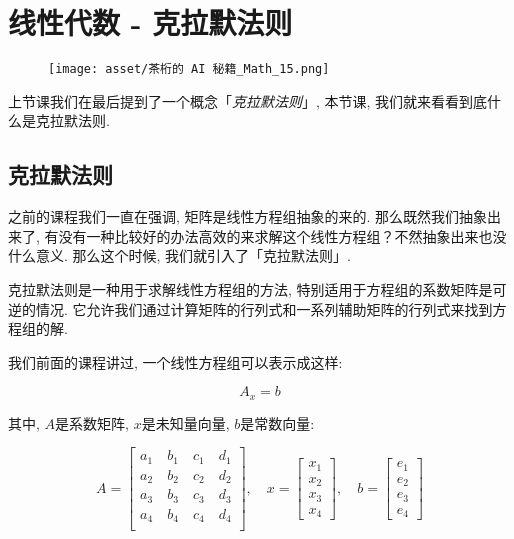 \chapter{线性代数 - 克拉默法则}

\begin{figure}[ht]
  \centering
  \texttt{[image: asset/茶桁的 AI 秘籍\_Math\_15.png]}
\end{figure}

\newpage

上节课我们在最后提到了一个概念「\textit{克拉默法则}」, 本节课, 我们就来看看到底什么是克拉默法则. 

\hypertarget{15.线性代数}{}
\section{克拉默法则}

之前的课程我们一直在强调, 矩阵是线性方程组抽象的来的. 那么既然我们抽象出来了, 有没有一种比较好的办法高效的来求解这个线性方程组？不然抽象出来也没什么意义. 那么这个时候, 我们就引入了「克拉默法则」. 

克拉默法则是一种用于求解线性方程组的方法, 特别适用于方程组的系数矩阵是可逆的情况. 它允许我们通过计算矩阵的行列式和一系列辅助矩阵的行列式来找到方程组的解. 

我们前面的课程讲过, 一个线性方程组可以表示成这样: 

\[
  A_x = b
\]

其中, $A$是系数矩阵, $x$是未知量向量, $b$是常数向量: 

\[
  A = 
  \begin{bmatrix}
  a_1 \quad b_1 \quad c_1 \quad  d_1 \\
  a_2 \quad b_2 \quad c_2 \quad  d_2 \\ 
  a_3 \quad b_3 \quad c_3 \quad  d_3 \\
  a_4 \quad b_4 \quad c_4 \quad  d_4 \\
  \end{bmatrix}, \quad
  x = 
  \begin{bmatrix}
  x_1 \\
  x_2 \\
  x_3 \\
  x_4
  \end{bmatrix}, \quad
  b = 
  \begin{bmatrix}
  e_1 \\
  e_2 \\
  e_3 \\
  e_4
  \end{bmatrix}
\]

